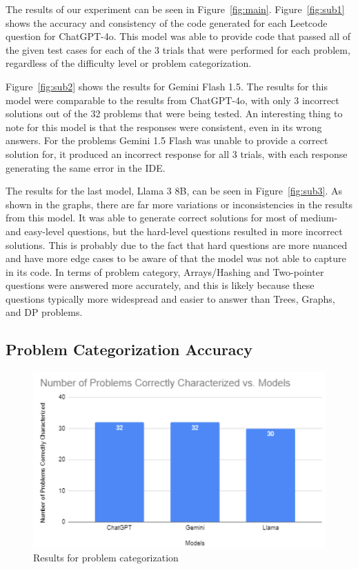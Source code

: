 \documentclass[times, 10pt,twocolumn]{article}
\begin{document}
The results of our experiment can be seen in Figure~\ref{fig:main}. Figure~\ref{fig:sub1} shows the accuracy and consistency of the code generated for each Leetcode question for ChatGPT-4o. This model was able to provide code that passed all of the given test cases for each of the 3 trials that were performed for each problem, regardless of the difficulty level or problem categorization.

Figure~\ref{fig:sub2} shows the results for Gemini Flash 1.5. The results for this model were comparable to the results from ChatGPT-4o, with only 3 incorrect solutions out of the 32 problems that were being tested. An interesting thing to note for this model is that the responses were consistent, even in its wrong answers. For the problems Gemini 1.5 Flash was unable to provide a correct solution for, it produced an incorrect response for all 3 trials, with each response generating the same error in the IDE. 

The results for the last model, Llama 3 8B, can be seen in Figure~\ref{fig:sub3}. As shown in the graphs, there are far more variations or inconsistencies in the results from this model.
It was able to generate correct solutions for most of medium- and easy-level questions, but the hard-level questions resulted in more incorrect solutions. This is probably due to the fact that hard questions are more nuanced and have more edge cases to be aware of that the model was not able to capture in its code. In terms of problem category,
Arrays/Hashing and Two-pointer questions were answered more accurately, and this is likely because these questions typically more widespread and easier to answer than Trees, Graphs, and DP problems. 

\subsection{Problem Categorization Accuracy}

\begin{figure}[h]
    \centering
    \includegraphics[width=0.45
    \textwidth]{imgs/categorization_all3.png} %
    \caption{Results for problem categorization}
    \label{fig:example} %
\end{figure}
\end{document}

